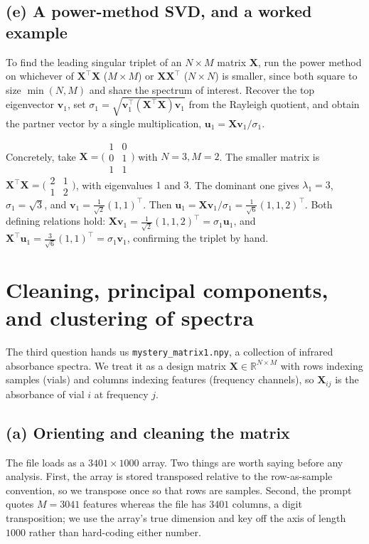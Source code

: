 \documentclass[12pt,a4paper]{article}
\theoremstyle{definition}
\newcommand{\T}{^{\!\top}}
\newcommand{\R}{\mathbb{R}}
\begin{document}
\subsection{(e) A power-method SVD, and a worked example}
To find the leading singular triplet of an $N\times M$ matrix $\mathbf X$, run the power method on
whichever of $\mathbf X\T\mathbf X$ ($M\times M$) or $\mathbf X\mathbf X\T$ ($N\times N$) is
smaller, since both square to size $\min(N,M)$ and share the spectrum of interest. Recover the top
eigenvector $\bm v_1$, set $\sigma_1=\sqrt{\bm v_1\T(\mathbf X\T\mathbf X)\bm v_1}$ from the
Rayleigh quotient, and obtain the partner vector by a single multiplication,
$\bm u_1=\mathbf X\bm v_1/\sigma_1$.

Concretely, take $\mathbf X=\bigl(\begin{smallmatrix}1&0\\0&1\\1&1\end{smallmatrix}\bigr)$ with
$N=3,M=2$. The smaller matrix is
$\mathbf X\T\mathbf X=\bigl(\begin{smallmatrix}2&1\\1&2\end{smallmatrix}\bigr)$, with eigenvalues
$1$ and $3$. The dominant one gives $\lambda_1=3$, $\sigma_1=\sqrt3$, and
$\bm v_1=\tfrac1{\sqrt2}(1,1)\T$. Then
$\bm u_1=\mathbf X\bm v_1/\sigma_1=\tfrac1{\sqrt6}(1,1,2)\T$. Both defining relations hold:
$\mathbf X\bm v_1=\tfrac1{\sqrt2}(1,1,2)\T=\sigma_1\bm u_1$, and
$\mathbf X\T\bm u_1=\tfrac{3}{\sqrt6}(1,1)\T=\sigma_1\bm v_1$, confirming the triplet by hand.

\section{Cleaning, principal components, and clustering of spectra}

The third question hands us \texttt{mystery\_matrix1.npy}, a collection of infrared absorbance
spectra. We treat it as a design matrix $\mathbf X\in\R^{N\times M}$ with rows indexing samples
(vials) and columns indexing features (frequency channels), so $\mathbf X_{ij}$ is the absorbance
of vial $i$ at frequency $j$.

\subsection{(a) Orienting and cleaning the matrix}
The file loads as a $3401\times1000$ array. Two things are worth saying before any analysis. First,
the array is stored transposed relative to the row-as-sample convention, so we transpose once so
that rows are samples. Second, the prompt quotes $M=3041$ features whereas the file has $3401$
columns, a digit transposition; we use the array's true dimension and key off the axis of length
$1000$ rather than hard-coding either number.
\end{document}
